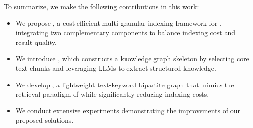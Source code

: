 To summarize, we make the following contributions in this work:
\begin{itemize}[topsep=2pt,itemsep=1pt,parsep=0pt,partopsep=0pt,leftmargin=11pt]
    \item We propose \sketrag, a cost-efficient multi-granular indexing framework for \graphrag, integrating two complementary components to balance indexing cost and result quality.
    \item We introduce \skeletonrag, which constructs a knowledge graph skeleton by selecting core text chunks and leveraging LLMs to extract structured knowledge.
    \item We develop \keyrag, a lightweight text-keyword bipartite graph that mimics the retrieval paradigm of \kgrag while significantly reducing indexing costs.
    \item We conduct extensive experiments demonstrating the improvements of our proposed solutions.
\end{itemize}






